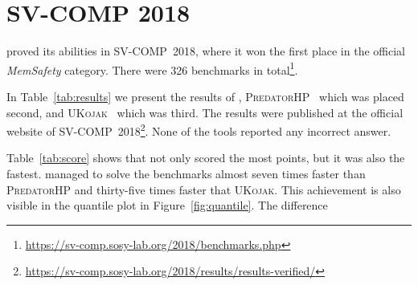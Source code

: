\section{SV-COMP 2018}

\symbiotic proved its abilities in SV-COMP~2018, where it won the first place
in the official \emph{MemSafety} category. There were 326 benchmarks in
total\footnote{\url{https://sv-comp.sosy-lab.org/2018/benchmarks.php}}.

In Table~\ref{tab:results} we present the results of \symbiotic,
\textsc{PredatorHP}~\cite{predatorhp} which was placed second, and \textsc{UKojak}~\cite{ukojak} which was
third. The results were published at the official website of
SV-COMP~2018\footnote{\url{https://sv-comp.sosy-lab.org/2018/results/results-verified/}}.
None of the tools reported any incorrect answer.


Table~\ref{tab:score} shows that not only \symbiotic scored the most points,
but it was also the fastest. \symbiotic managed to solve the benchmarks almost
seven times faster than \textsc{PredatorHP} and thirty-five times faster that
\textsc{UKojak}. This achievement is also visible in the quantile plot in
Figure~\ref{fig:quantile}. The difference

